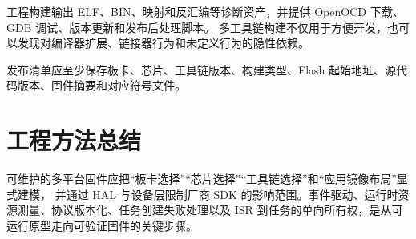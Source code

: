 工程构建输出 ELF、BIN、映射和反汇编等诊断资产，并提供 OpenOCD 下载、GDB 调试、版本更新和发布后处理脚本。
多工具链构建不仅用于方便开发，也可以发现对编译器扩展、链接器行为和未定义行为的隐性依赖。

发布清单应至少保存板卡、芯片、工具链版本、构建类型、Flash 起始地址、源代码版本、固件摘要和对应符号文件。

\section{工程方法总结}

可维护的多平台固件应把“板卡选择”“芯片选择”“工具链选择”和“应用镜像布局”显式建模，
并通过 HAL 与设备层限制厂商 SDK 的影响范围。事件驱动、运行时资源测量、协议版本化、任务创建失败处理以及 ISR 到任务的单向所有权，是从可运行原型走向可验证固件的关键步骤。
